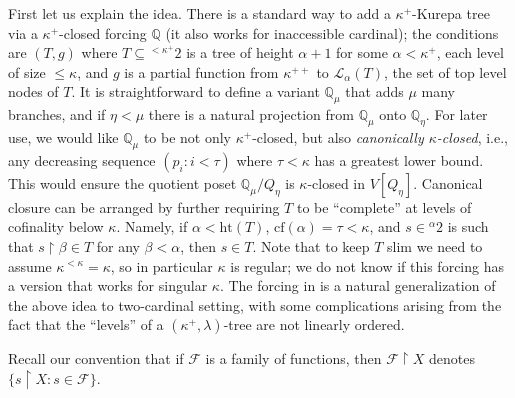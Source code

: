 \documentclass[10pt,reqno]{amsart}
\theoremstyle{plain}
\theoremstyle{definition}
\theoremstyle{remark}
\begin{document}
First let us explain the idea. There is a standard way to add a $\kappa^+$-Kurepa tree via a $\kappa^+$-closed forcing $\mathbb{Q}$ (it also works for inaccessible cardinal); the conditions are $(T,g)$ where $T\subseteq {}^{<\kappa^+}2$ is a tree of height $\alpha+1$ for some $\alpha<\kappa^+$, each level of size $\leq\kappa$, and $g$ is a partial function from $\kappa^{++}$ to $\mathcal{L}_\alpha(T)$, the set of top level nodes of $T$. It is straightforward to define a variant $\mathbb{Q}_\mu$ that adds $\mu$ many branches, and if $\eta<\mu$ there is a natural projection from $\mathbb{Q}_\mu$ onto $\mathbb{Q}_\eta$. For later use, we would like $\mathbb{Q}_\mu$ to be not only $\kappa^+$-closed, but also \textit{canonically $\kappa$-closed}, i.e., any decreasing sequence $(p_i:i<\tau)$ where $\tau<\kappa$ has a greatest lower bound. This would ensure the quotient poset $\mathbb{Q}_\mu/Q_\eta$ is $\kappa$-closed in $V[Q_\eta]$. Canonical closure can be arranged by further requiring $T$ to be ``complete'' at levels of cofinality below $\kappa$. Namely, if $\alpha<\mathrm{ht}(T)$, $\mathrm{cf}(\alpha)=\tau<\kappa$, and $s\in {}^{\alpha}2$ is such that $s\upharpoonright\beta\in T$ for any $\beta<\alpha$, then $s\in T$. Note that to keep $T$ slim we need to assume $\kappa^{<\kappa}=\kappa$, so in particular $\kappa$ is regular; we do not know if this forcing has a version that works for singular $\kappa$. The forcing in \cite{friedman-golshani2012independence} is a natural generalization of the above idea to two-cardinal setting, with some complications arising from the fact that the ``levels'' of a $(\kappa^+,\lambda)$-tree are not linearly ordered.

Recall our convention that if $\mathcal{F}$ is a family of functions, then $\mathcal{F}\upharpoonright X$ denotes $\{s\upharpoonright X:s\in\mathcal{F}\}$.
\end{document}

